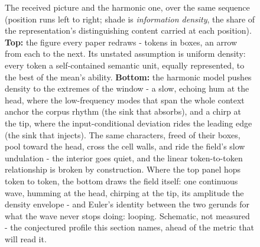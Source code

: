 \begin{figure}[t]
  \caption{The received picture and the harmonic one, over the same sequence (position runs left to right; shade is \textit{information density}, the share of the representation's distinguishing content carried at each position). \textbf{Top:} the figure every paper redraws - tokens in boxes, an arrow from each to the next. Its unstated assumption is uniform density: every token a self-contained semantic unit, equally represented, to the best of the mean's ability. \textbf{Bottom:} the harmonic model pushes density to the extremes of the window - a slow, echoing hum at the head, where the low-frequency modes that span the whole context anchor the corpus rhythm (the sink that absorbs), and a chirp at the tip, where the input-conditional deviation rides the leading edge (the sink that injects). The same characters, freed of their boxes, pool toward the head, cross the cell walls, and ride the field's slow undulation - the interior goes quiet, and the linear token-to-token relationship is broken by construction. Where the top panel hops token to token, the bottom draws the field itself: one continuous wave, humming at the head, chirping at the tip, its amplitude the density envelope - and Euler's identity between the two gerunds for what the wave never stops doing: looping. Schematic, not measured - the conjectured profile this section names, ahead of the metric that will read it.}
  \label{fig:density}
\end{figure}

